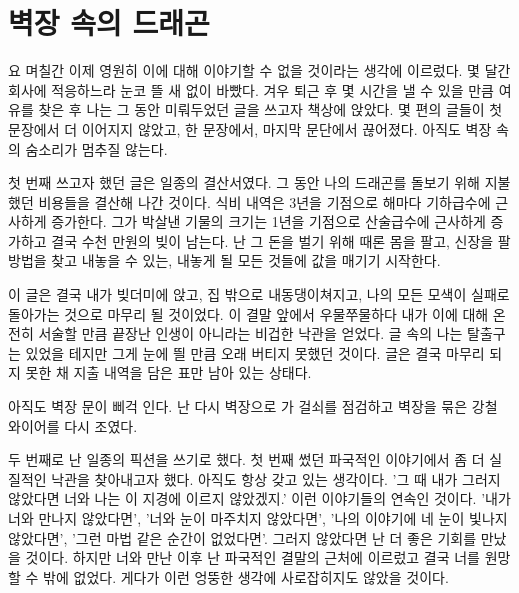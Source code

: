 \hypertarget{uxbcbduxc7a5-uxc18duxc758-uxb4dcuxb798uxace4}{%

\chapter{벽장 속의 드래곤}\label{uxbcbduxc7a5-uxc18duxc758-uxb4dcuxb798uxace4}}



요 며칠간 이제 영원히 이에 대해 이야기할 수 없을 것이라는 생각에 이르렀다. 몇 달간 회사에 적응하느라 눈코 뜰 새 없이 바빴다. 겨우 퇴근 후 몇 시간을 낼 수 있을 만큼 여유를 찾은 후 나는 그 동안 미뤄두었던 글을 쓰고자 책상에 앉았다. 몇 편의 글들이 첫 문장에서 더 이어지지 않았고, 한 문장에서, 마지막 문단에서 끊어졌다. 아직도 벽장 속의 숨소리가 멈추질 않는다.



첫 번째 쓰고자 했던 글은 일종의 결산서였다. 그 동안 나의 드래곤를 돌보기 위해 지불했던 비용들을 결산해 나간 것이다. 식비 내역은 3년을 기점으로 해마다 기하급수에 근사하게 증가한다. 그가 박살낸 기물의 크기는 1년을 기점으로 산술급수에 근사하게 증가하고 결국 수천 만원의 빚이 남는다. 난 그 돈을 벌기 위해 때론 몸을 팔고, 신장을 팔 방법을 찾고 내놓을 수 있는, 내놓게 될 모든 것들에 값을 매기기 시작한다.



이 글은 결국 내가 빚더미에 앉고, 집 밖으로 내동댕이쳐지고, 나의 모든 모색이 실패로 돌아가는 것으로 마무리 될 것이었다. 이 결말 앞에서 우물쭈물하다 내가 이에 대해 온전히 서술할 만큼 끝장난 인생이 아니라는 비겁한 낙관을 얻었다. 글 속의 나는 탈출구는 있었을 테지만 그게 눈에 띌 만큼 오래 버티지 못했던 것이다. 글은 결국 마무리 되지 못한 채 지출 내역을 담은 표만 남아 있는 상태다.



아직도 벽장 문이 삐걱 인다. 난 다시 벽장으로 가 걸쇠를 점검하고 벽장을 묶은 강철 와이어를 다시 조였다.



두 번째로 난 일종의 픽션을 쓰기로 했다. 첫 번째 썼던 파국적인 이야기에서 좀 더 실질적인 낙관을 찾아내고자 했다. 아직도 항상 갖고 있는 생각이다. '그 때 내가 그러지 않았다면 너와 나는 이 지경에 이르지 않았겠지.' 이런 이야기들의 연속인 것이다. '내가 너와 만나지 않았다면', '너와 눈이 마주치지 않았다면', '나의 이야기에 네 눈이 빛나지 않았다면', '그런 마법 같은 순간이 없었다면'. 그러지 않았다면 난 더 좋은 기회를 만났을 것이다. 하지만 너와 만난 이후 난 파국적인 결말의 근처에 이르렀고 결국 너를 원망할 수 밖에 없었다. 게다가 이런 엉뚱한 생각에 사로잡히지도 않았을 것이다.



